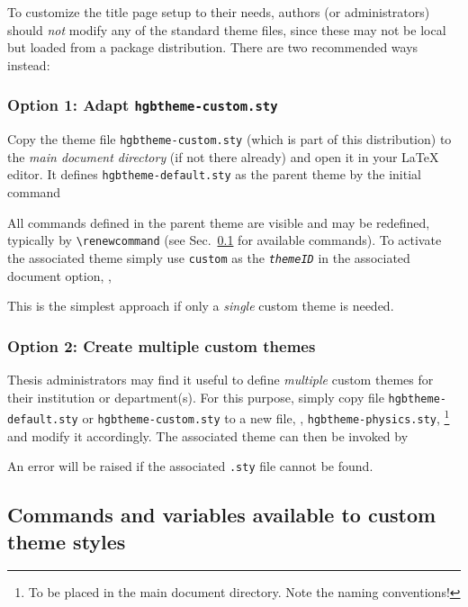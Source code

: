 \documentclass[language=english]{hgbarticle}
\begin{document}
To customize the title page setup to their needs, authors (or administrators) should 
\emph{not} modify any of the standard theme files, since these may not be local but loaded
from a package distribution.
There are two recommended ways instead:

\subsubsection{Option 1: Adapt \texttt{hgbtheme-custom.sty}}

Copy the theme file \texttt{hgbtheme-custom.sty} (which is part of this distribution) to the 
\emph{main document directory} (if not there already) and open it in your LaTeX editor.
It defines \texttt{hgbtheme-default.sty} as the parent theme by the initial command
\begin{LaTeXCode}[numbers=none]
\end{LaTeXCode}
%
All commands defined in the parent theme are visible and may be redefined,
typically by \verb!\renewcommand! (see Sec.\ \ref{sec:ThemeStyleCommands}
for available commands).
To activate the associated theme simply use \texttt{custom} as the \texttt{\textit{themeID}}
in the associated document option, \ie,
%
%
This is the simplest approach if only a \emph{single} custom theme is needed.

\subsubsection{Option 2: Create multiple custom themes}

Thesis administrators may find it useful to define \emph{multiple} custom themes for their
institution or department(s).
For this purpose, simply copy file \texttt{hgbtheme-default.sty} or \texttt{hgbtheme-custom.sty}
to a new file, \eg, \texttt{hgbtheme-physics.sty},%
\footnote{To be placed in the main document directory. Note the naming conventions!}
and modify it accordingly. The associated theme can then be invoked by
%
%
An error will be raised if the associated \texttt{.sty} file cannot be found.



\subsection{Commands and variables available to custom theme styles}
\label{sec:ThemeStyleCommands}
\end{document}

